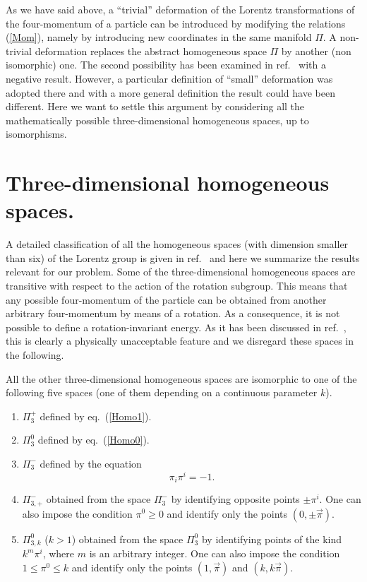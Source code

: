 \documentclass[a4paper,12pt]{article}
\begin{document}
As we have said above, a ``trivial'' deformation of the Lorentz transformations of the four-momentum of a particle can be introduced by modifying the relations (\ref{Mom}), namely by introducing new coordinates in the same manifold $\Pi$. A non-trivial deformation replaces the abstract homogeneous space $\Pi$ by another (non isomorphic) one. The second possibility has been examined in ref.\ \cite{Toller} with a negative result. However, a particular definition of ``small'' deformation was adopted there and with a more general definition the result could have been different. Here we want to settle this argument by considering all the mathematically possible three-dimensional homogeneous spaces, up to isomorphisms.

\section{Three-dimensional homogeneous spaces.}

 A detailed classification of all the homogeneous spaces (with dimension smaller than six) of the Lorentz group is given in ref.\ \cite{Toller1} and here we summarize the results relevant for our problem. Some of the three-dimensional homogeneous spaces are transitive with respect to the action of the rotation subgroup. This means that any possible four-momentum of the particle can be obtained from another arbitrary four-momentum by means of a rotation. As a consequence, it is not possible to define a rotation-invariant energy. As it has been discussed in ref.\ \cite{Toller}, this is clearly a physically unacceptable feature and we disregard these spaces in the following. 

All the other three-dimensional homogeneous spaces are isomorphic to one of the following five spaces (one of them depending on a continuous parameter $k$).
\renewcommand{\labelenumi}{\alph{enumi})}
\begin{enumerate}
\item $\Pi_3^+$ defined by eq.\ (\ref{Homo1}).
\item $\Pi_3^0$ defined by eq.\ (\ref{Homo0}).
\item $\Pi_3^-$ defined by the equation
\begin{equation}  \label{Homo2}
\pi_i \pi^i = -1.
\end{equation} 
\item $\Pi_{3,+}^-$ obtained from the space $\Pi_3^-$ by identifying opposite points $\pm \pi^i$. One can also impose the condition $\pi^0 \geq 0$ and identify only  the points $(0, \pm \vec \pi)$.
\item $\Pi_{3,k}^0$ ($k > 1$) obtained from the space $\Pi_3^0$ by identifying points of the kind $k^m \pi^i$, where $m$ is an arbitrary integer.  One can also impose the condition $1 \leq \pi^0 \leq k$ and identify only the points $(1, \vec \pi)$ and $(k, k \vec \pi)$.
\end{enumerate}
\end{document}
